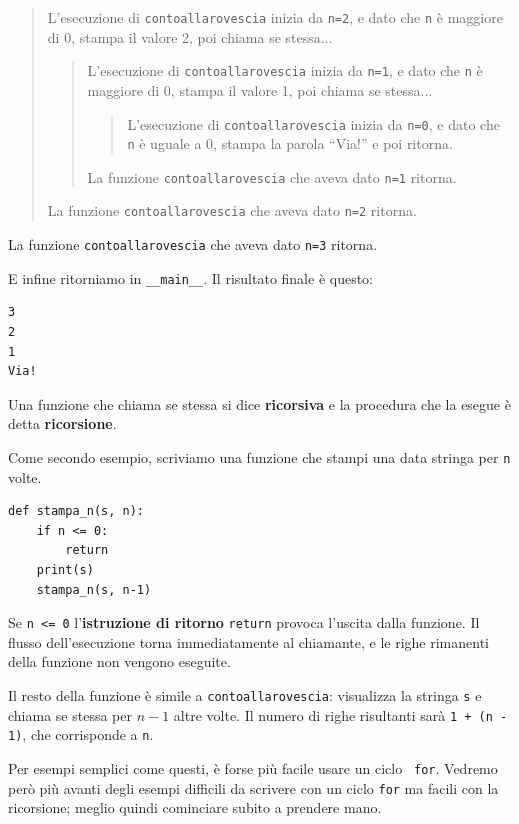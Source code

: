 \documentclass[10pt]{book}
\begin{document}
\begin{quote}
L'esecuzione di {\tt contoallarovescia} inizia da {\tt n=2}, e dato che
{\tt n} è maggiore di 0, stampa il valore 2, poi chiama se stessa...

\begin{quote}
L'esecuzione di {\tt contoallarovescia} inizia da {\tt n=1}, e dato che
{\tt n} è maggiore di 0, stampa il valore 1, poi chiama se stessa...

\begin{quote}
L'esecuzione di {\tt contoallarovescia} inizia da {\tt n=0}, e dato che {\tt
n} è uguale a 0, stampa la parola ``Via!'' e poi ritorna.
\end{quote}

La funzione {\tt contoallarovescia} che aveva dato {\tt n=1} ritorna.
\end{quote}

La funzione {\tt contoallarovescia} che aveva dato {\tt n=2} ritorna.
\end{quote}

La funzione {\tt contoallarovescia} che aveva dato {\tt n=3} ritorna.

E infine ritorniamo in \verb"__main__". Il risultato finale è questo:

\begin{verbatim}
3
2
1
Via!
\end{verbatim}
%
Una funzione che chiama se stessa si dice {\bf ricorsiva} e la procedura che la esegue è detta {\bf ricorsione}.

Come secondo esempio, scriviamo una funzione che stampi una data stringa per {\tt n} volte.

\begin{verbatim}
def stampa_n(s, n):
    if n <= 0:
        return
    print(s)
    stampa_n(s, n-1)
\end{verbatim}
%
Se {\tt n <= 0} l'{\bf istruzione di ritorno} {\tt return} provoca l'uscita dalla funzione. Il flusso dell'esecuzione torna immediatamente al chiamante, e le righe rimanenti della funzione non vengono eseguite.

Il resto della funzione è simile a {\tt contoallarovescia}: visualizza la stringa {\tt s} e chiama se stessa per $n-1$ altre volte. Il numero di righe risultanti sarà {\tt 1 + (n - 1)}, che corrisponde a
{\tt n}.

Per esempi semplici come questi, è forse più facile usare un ciclo {\tt
for}. Vedremo però più avanti degli esempi difficili da scrivere con un ciclo {\tt for} ma facili con la ricorsione; meglio quindi cominciare subito a prendere mano.
\end{document}
